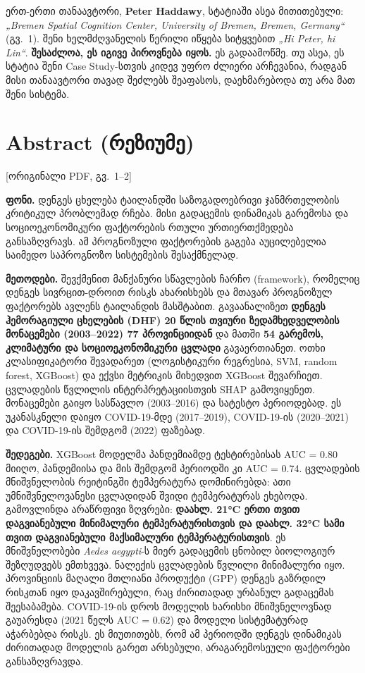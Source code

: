 \documentclass[11pt,a4paper]{article}
\newcommand{\imp}[1]{\textbf{\color{importred}#1}}
\newcommand{\pg}[1]{{\small\color{gray}[ორიგინალი PDF, გვ.~#1]}}
\begin{document}
\begin{tcolorbox}[colback=importred!5,colframe=importred,fonttitle=\bfseries,title={ყურადღება: ბრემენის კავშირი}]
ერთ-ერთი თანაავტორი, \textbf{Peter Haddawy}, სტატიაში ასეა მითითებული:
\textit{„Bremen Spatial Cognition Center, University of Bremen, Bremen, Germany“} (გვ.~1).
შენი ხელმძღვანელის წერილი იწყება სიტყვებით \textit{„Hi Peter, hi Lin“}. \imp{შესაძლოა, ეს იგივე პიროვნება იყოს.}
ეს გადაამოწმე. თუ ასეა, ეს სტატია შენი Case Study-სთვის კიდევ უფრო ძლიერი არჩევანია,
რადგან მისი თანაავტორი თავად შეძლებს შეაფასოს, დაეხმარებოდა თუ არა მათ შენი სისტემა.
\end{tcolorbox}

\section{Abstract (რეზიუმე)} \pg{1--2}

\textbf{ფონი.} დენგეს ცხელება ტაილანდში საზოგადოებრივი ჯანმრთელობის კრიტიკულ პრობლემად რჩება.
მისი გადაცემის დინამიკას გარემოსა და სოციოეკონომიკური ფაქტორების რთული ურთიერთქმედება განსაზღვრავს.
ამ პროგნოზული ფაქტორების გაგება აუცილებელია საიმედო საპროგნოზო სისტემების შესაქმნელად.

\textbf{მეთოდები.} შევქმენით მანქანური სწავლების ჩარჩო (framework), რომელიც დენგეს სივრცით-დროით რისკს
ახარისხებს და მთავარ პროგნოზულ ფაქტორებს ავლენს ტაილანდის მასშტაბით. გავაანალიზეთ
\imp{დენგეს ჰემორაგიული ცხელების (DHF) 20 წლის თვიური ზედამხედველობის მონაცემები (2003--2022) 77 პროვინციიდან}
და მათში \imp{54 გარემოს, კლიმატური და სოციოეკონომიკური ცვლადი} გავაერთიანეთ.
ოთხი კლასიფიკატორი შევადარეთ (ლოგისტიკური რეგრესია, SVM, random forest, XGBoost) და
ექვსი მეტრიკის მიხედვით XGBoost შევარჩიეთ. ცვლადების წვლილის ინტერპრეტაციისთვის SHAP გამოვიყენეთ.
მონაცემები გაიყო სასწავლო (2003--2016) და სატესტო პერიოდებად. ეს უკანასკნელი დაიყო
COVID-19-მდე (2017--2019), COVID-19-ის (2020--2021) და COVID-19-ის შემდგომ (2022) ფაზებად.

\textbf{შედეგები.} XGBoost მოდელმა პანდემიამდე ტესტირებისას AUC = 0.80 მიიღო, პანდემიისა და მის შემდგომ
პერიოდში კი AUC = 0.74. ცვლადების მნიშვნელობის რეიტინგში ტემპერატურა დომინირებდა: ათი უმნიშვნელოვანესი
ცვლადიდან შვიდი ტემპერატურას ეხებოდა. გამოვლინდა არაწრფივი ზღვრები:
\imp{დაახლ. 21°C ერთი თვით დაგვიანებული მინიმალური ტემპერატურისთვის და დაახლ. 32°C სამი თვით დაგვიანებული მაქსიმალური ტემპერატურისთვის}.
ეს მნიშვნელობები \textit{Aedes aegypti}-ს მიერ გადაცემის ცნობილ ბიოლოგიურ შეზღუდვებს ემთხვევა.
ნალექის ცვლადების წვლილი მინიმალური იყო. პროვინციის მაღალი მთლიანი პროდუქტი (GPP)
დენგეს გაზრდილ რისკთან იყო დაკავშირებული, რაც ძირითადად ურბანულ გადაცემას შეესაბამება.
COVID-19-ის დროს მოდელის ხარისხი მნიშვნელოვნად გაუარესდა (2021 წელს AUC = 0.62) და მოდელი
სისტემატურად აჭარბებდა რისკს. ეს მიუთითებს, რომ ამ პერიოდში დენგეს დინამიკას ძირითადად
მოდელის გარეთ არსებული, არაგარემოსეული ფაქტორები განსაზღვრავდა.
\end{document}
